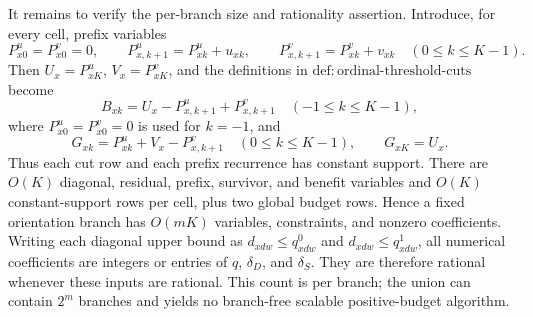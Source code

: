 It remains to verify the per-branch size and rationality assertion.  Introduce, for every cell, prefix variables
\[
 P^u_{x0}=P^v_{x0}=0,
 \qquad
 P^u_{x,k+1}=P^u_{xk}+u_{xk},
 \qquad
 P^v_{x,k+1}=P^v_{xk}+v_{xk}
 \quad(0\leq k\leq K-1).
\]
Then \(U_x=P^u_{xK}\), \(V_x=P^v_{xK}\), and the definitions in \(\mathrm{def:ordinal\text{-}threshold\text{-}cuts}\) become
\[
 B_{xk}=U_x-P^u_{x,k+1}+P^v_{x,k+1}
 \quad(-1\leq k\leq K-1),
\]
where \(P^u_{x0}=P^v_{x0}=0\) is used for \(k=-1\), and
\[
 G_{xk}=P^u_{xk}+V_x-P^v_{x,k+1}
 \quad(0\leq k\leq K-1),
 \qquad
 G_{xK}=U_x.
\]
Thus each cut row and each prefix recurrence has constant support.  There are \(O(K)\) diagonal, residual, prefix, survivor, and benefit variables and \(O(K)\) constant-support rows per cell, plus two global budget rows.  Hence a fixed orientation branch has \(O(mK)\) variables, constraints, and nonzero coefficients.  Writing each diagonal upper bound as \(d_{xdw}\leq q^0_{xdw}\) and \(d_{xdw}\leq q^1_{xdw}\), all numerical coefficients are integers or entries of \(q\), \(\delta_D\), and \(\delta_S\).  They are therefore rational whenever these inputs are rational.  This count is per branch; the union can contain \(2^m\) branches and yields no branch-free scalable positive-budget algorithm.


